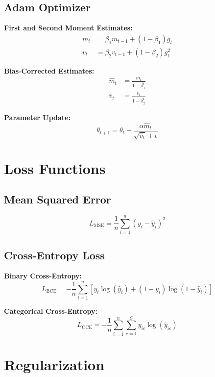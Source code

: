 \subsection{Adam Optimizer}

\textbf{First and Second Moment Estimates:}
\begin{align}
m_t &= \beta_1 m_{t-1} + (1-\beta_1) g_t \\
v_t &= \beta_2 v_{t-1} + (1-\beta_2) g_t^2
\end{align}

\textbf{Bias-Corrected Estimates:}
\begin{align}
\hat{m}_t &= \frac{m_t}{1-\beta_1^t} \\
\hat{v}_t &= \frac{v_t}{1-\beta_2^t}
\end{align}

\textbf{Parameter Update:}
\begin{equation}
\theta_{t+1} = \theta_t - \frac{\alpha \hat{m}_t}{\sqrt{\hat{v}_t} + \epsilon}
\end{equation}

\section{Loss Functions}

\subsection{Mean Squared Error}

\begin{equation}
L_{\text{MSE}} = \frac{1}{n}\sum_{i=1}^{n}(y_i - \hat{y}_i)^2
\end{equation}

\subsection{Cross-Entropy Loss}

\textbf{Binary Cross-Entropy:}
\begin{equation}
L_{\text{BCE}} = -\frac{1}{n}\sum_{i=1}^{n}[y_i \log(\hat{y}_i) + (1-y_i)\log(1-\hat{y}_i)]
\end{equation}

\textbf{Categorical Cross-Entropy:}
\begin{equation}
L_{\text{CCE}} = -\frac{1}{n}\sum_{i=1}^{n}\sum_{c=1}^{C} y_{ic} \log(\hat{y}_{ic})
\end{equation}

\section{Regularization}

